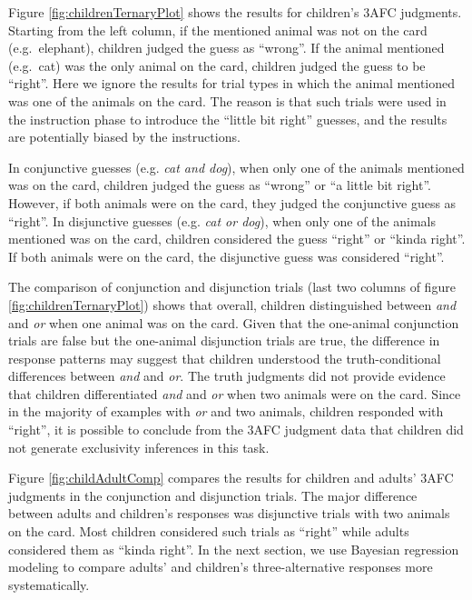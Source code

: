 \documentclass[floatsintext,man]{apa6}
\theoremstyle{definition}
\theoremstyle{definition}
\theoremstyle{definition}
\theoremstyle{remark}
\begin{document}
Figure \ref{fig:childrenTernaryPlot} shows the results for children's
3AFC judgments. Starting from the left column, if the mentioned animal
was not on the card (e.g.~elephant), children judged the guess as
\enquote{wrong}. If the animal mentioned (e.g.~cat) was the only animal
on the card, children judged the guess to be \enquote{right}. Here we
ignore the results for trial types in which the animal mentioned was one
of the animals on the card. The reason is that such trials were used in
the instruction phase to introduce the \enquote{little bit right}
guesses, and the results are potentially biased by the instructions.

In conjunctive guesses (e.g. \emph{cat and dog}), when only one of the
animals mentioned was on the card, children judged the guess as
\enquote{wrong} or \enquote{a little bit right}. However, if both
animals were on the card, they judged the conjunctive guess as
\enquote{right}. In disjunctive guesses (e.g. \emph{cat or dog}), when
only one of the animals mentioned was on the card, children considered
the guess \enquote{right} or \enquote{kinda right}. If both animals were
on the card, the disjunctive guess was considered \enquote{right}.

The comparison of conjunction and disjunction trials (last two columns
of figure \ref{fig:childrenTernaryPlot}) shows that overall, children
distinguished between \emph{and} and \emph{or} when one animal was on
the card. Given that the one-animal conjunction trials are false but the
one-animal disjunction trials are true, the difference in response
patterns may suggest that children understood the truth-conditional
differences between \emph{and} and \emph{or}. The truth judgments did
not provide evidence that children differentiated \emph{and} and
\emph{or} when two animals were on the card. Since in the majority of
examples with \emph{or} and two animals, children responded with
\enquote{right}, it is possible to conclude from the 3AFC judgment data
that children did not generate exclusivity inferences in this task.

Figure \ref{fig:childAdultComp} compares the results for children and
adults' 3AFC judgments in the conjunction and disjunction trials. The
major difference between adults and children's responses was disjunctive
trials with two animals on the card. Most children considered such
trials as \enquote{right} while adults considered them as \enquote{kinda
right}. In the next section, we use Bayesian regression modeling to
compare adults' and children's three-alternative responses more
systematically.
\end{document}
